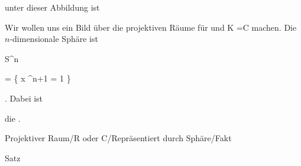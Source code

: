  unter dieser Abbildung ist





Wir wollen uns ein Bild über die projektiven Räume für   {  und  }  { {\mathbb K} ={\mathbb C}  }{ } machen. Die
 {} {}
$n$-dimensionale Sphäre ist


\mavergleichskettedisp

{\vergleichskette

{ S^n
}

{ =} { \left\{ x \in \R^{n+1}  \mid   {} \Vert = 1        \right\}
}

{ } {
}

{ } {
}

{ } {
}

}
{}{}{.}
Dabei ist

 die  {.}



{Projektiver Raum/R oder C/Repräsentiert durch Sphäre/Fakt}

{Satz}

{}


